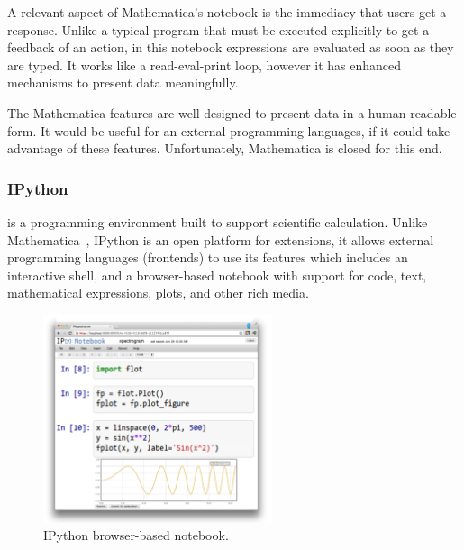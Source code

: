 A relevant aspect of Mathematica's notebook is the immediacy that users get a response. Unlike a typical program that must be executed explicitly to get a feedback of an action, in this notebook expressions are evaluated as soon as they are typed. It works like a read-eval-print loop, however it has enhanced mechanisms to present data meaningfully.

The Mathematica features are well designed to present data in a human readable form. It would be useful for an external programming languages, if it could take advantage of these features. Unfortunately, Mathematica is closed for this end.
\subsubsection{IPython~\cite{PER-GRA:2007}} is a programming environment built to support scientific calculation. Unlike Mathematica~\cite{wolfram1991mathematica},  IPython is an open platform for extensions, it allows external programming languages (frontends) to use its features which includes an interactive shell, and a browser-based notebook with support for code, text, mathematical expressions, plots, and other rich media. 

\begin{figure}
  \vspace{-35pt}
  \begin{center}
    \includegraphics[width=0.6\textwidth]{img/ipython-zoom}
  \end{center}
  \vspace{-25pt}
 \caption{IPython browser-based notebook.}  
    \vspace{-15pt}
    \label{fig:ipython}
\end{figure}

